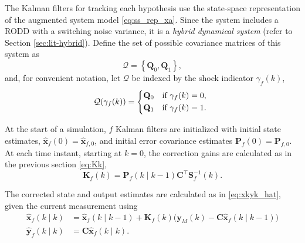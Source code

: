 {The Kalman filters for tracking each hypothesis use the state-space representation of the augmented system model \eqref{eq:ss_rep_xa}. Since the system includes a \gls{RODD} with a switching noise variance, it is a \textit{hybrid dynamical system} (refer to Section \ref{sec:lit-hybrid}). Define the set of possible covariance matrices of this system as
\begin{equation} \label{eq:init_Q_R}
	\mathcal{Q} = \left\{\mathbf{Q}_0, \mathbf{Q}_1\right\},
\end{equation}
and, for convenient notation, let $\mathcal{Q}$ be indexed by the shock indicator $\gamma_f(k)$,
\begin{equation} \label{eq:init_Q}
	\mathcal{Q}(\gamma_f(k)) = 
	\begin{cases*}
		\mathbf{Q}_0 & \text{if} $\gamma_f(k)=0$, \\
		\mathbf{Q}_1 & \text{if} $\gamma_f(k)=1$.
	\end{cases*}
\end{equation}

At the start of a simulation, $f$ Kalman filters are initialized with initial state estimates, $\mathbf{\hat{x}}_f(0) = \mathbf{\hat{x}}_{f,0}$, and initial error covariance estimates $	\mathbf{P}_f(0) = \mathbf{P}_{f,0}$. At each time instant, starting at $k=0$, the correction gains are calculated as in the previous section \eqref{eq:Kk},
%
\begin{equation} \label{eq:Kfk}
	\mathbf{K}_f(k) = \mathbf{P}_f(k \mid k-1)\mathbf{C}^\intercal \mathbf{S}_f^{-1}(k).
\end{equation}

The corrected state and output estimates are calculated as in \eqref{eq:xkyk_hat}, given the current measurement using
%
%
\begin{equation} \label{eq:xfkyfk_hat}
	\begin{aligned}
		\mathbf{\hat{x}}_f(k \mid k) &= \mathbf{\hat{x}}_f(k \mid k-1) + \mathbf{K}_f(k) \big( \mathbf{y}_M(k) - \mathbf{C} \mathbf{\hat{x}}_f(k \mid k-1) \big) \\
		\mathbf{\hat{y}}_f(k \mid k) &= \mathbf{C} \mathbf{\hat{x}}_f(k \mid k).
	\end{aligned}
\end{equation}

}

